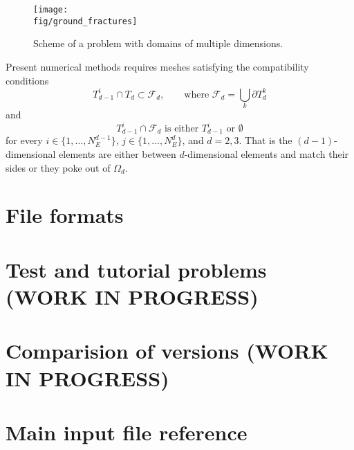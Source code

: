 \documentclass[12pt,a4paper]{report}
\def\fig{figures}
\begin{document}
\begin{figure}[h]
\centering
\texttt{[image: \\fig/ground\_fractures]}
\caption{
    \label{fig:multi-dim}
    Scheme of a problem with domains of multiple dimensions.
}
\end{figure}

Present numerical methods requires meshes satisfying the compatibility conditions
\begin{equation}
        T_{d-1}^i \cap T_d \subset \mathcal{F}_d,   \qquad \text{where } \mathcal{F}_d = \bigcup_{k} \partial T_{d}^{k}
\end{equation}
and
\begin{equation}
        T_{d-1}^i \cap \mathcal{F}_d    \text{ is either $T_{d-1}^i$ or $\emptyset$}    
\end{equation}
for every $i\in\{1,\dots, N_{E}^{d-1}\}$, $j\in\{1,\dots,N_{E}^{d}\}$,  and $d=2,3$. That is the $(d-1)$-dimensional elements are either between $d$-dimensional elements and
match their sides or they poke out of $\Omega_d$. 











%
%


\chapter{File formats}





% 
%   


\chapter{Test and tutorial problems (WORK IN PROGRESS)}
 \label{chapter:tests}
 
% 
 \chapter{Comparision of versions (WORK IN PROGRESS)}
 \label{chapter:version_comparision}
 

\chapter{Main input file reference}
\label{chapter:input-tree-reference}






\end{document}
